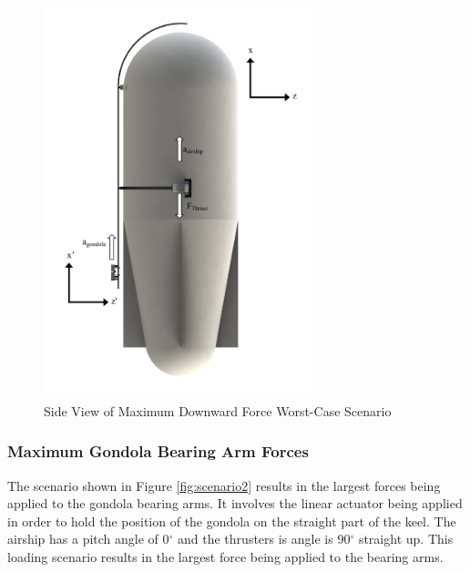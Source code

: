\documentclass[../main.tex]{subfiles}
\begin{document}
\begin{figure}[H]
	\centering
	\includegraphics[width=0.7\textwidth]{img/analysis/scenario1.pdf}
	\caption{Side View of Maximum Downward Force Worst-Case Scenario}
	\label{fig:scenario1}
\end{figure}

\subsubsection*{Maximum Gondola Bearing Arm Forces}
The scenario shown in Figure \ref{fig:scenario2} results in the largest forces being applied to the gondola bearing arms. It involves the linear actuator being applied in order to hold the position of the gondola on the straight part of the keel. The airship has a pitch angle of 0$^{\circ}$ and the thrusters is angle is 90$^{\circ}$ straight up. This loading scenario results in the largest force being applied to the bearing arms.
\end{document}
